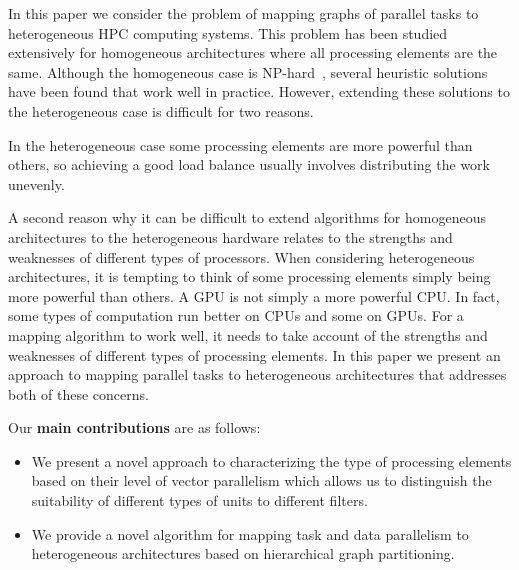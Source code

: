 In this paper we consider the problem of mapping graphs of parallel
tasks to heterogeneous HPC computing systems. This problem has been
studied extensively for homogeneous architectures where all processing
elements are the same. Although the homogeneous case is
NP-hard~\cite{vsar89}, several heuristic solutions have been found that
work well in practice. However, extending these solutions to the
heterogeneous case is difficult for two reasons.

In the heterogeneous case some processing elements are more powerful
than others, so achieving a good load balance usually involves
distributing the work unevenly. %

A second reason why it can be difficult to extend algorithms for
homogeneous architectures to the heterogeneous hardware relates to the
strengths and weaknesses of different types of processors. When
considering heterogeneous architectures, it is tempting to think of
some processing elements simply being more powerful than others. %
A GPU is not simply a more powerful CPU. In fact, some types of
computation run better on CPUs and some on GPUs.  For a mapping
algorithm to work well, it needs to take account of the strengths and
weaknesses of different types of processing elements. In this paper we
present an approach to mapping parallel tasks to heterogeneous
architectures that addresses both of these concerns.

Our \textbf{main contributions} are as follows:
\begin{itemize}
\item We present a novel approach to characterizing the type of
  processing elements based on their level of vector parallelism which
  allows us to distinguish the suitability of different types of units
  to different filters.
\item We provide a novel algorithm for mapping task and data parallelism
  to heterogeneous architectures based on hierarchical graph
  partitioning.
\end{itemize}


